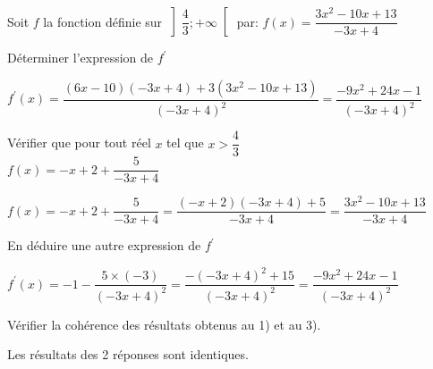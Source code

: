 \documentclass[12pt,a4paper]{article}  %
\begin{document}
Soit $f$ la fonction définie sur $\left] \dfrac{4}{3} ;+\infty\right[$ par: $f(x)=\dfrac{3 x^{2}-10x+13}{-3 x+4}$
\begin{enumMet}
	\item Déterminer l'expression de $f^{\prime}$\quad {}
	\begin{corrBox}
		$f^{\prime}(x)=\dfrac{(6 x-10)(-3 x+4)+3\left(3 x^{2}-10 x+13\right)}{(-3 x+4)^{2}}=\dfrac{-9 x^{2}+24 x-1}{(-3 x+4)^{2}}$
	\end{corrBox}
	\item Vérifier que pour tout réel $x$ tel que $x>\dfrac{4}{3}$\\ $f(x)=-x+2+\dfrac{5}{-3 x+4}$\quad {}
	\begin{corrBox}
		$f(x)=-x+2+\dfrac{5}{-3 x+4}=\dfrac{(-x+2)(-3 x+4)+5}{-3 x+4}=\dfrac{3 x^{2}-10 x+13}{-3 x+4}$
	\end{corrBox}
	\item En déduire une autre expression de $f^{\prime}$\quad {}
	\begin{corrBox}
		$f^{\prime}(x)=-1-\dfrac{5 \times(-3)}{(-3 x+4)^{2}}=\dfrac{-(-3 x+4)^{2}+15}{(-3 x+4)^{2}}=\dfrac{-9 x^{2}+24 x-1}{(-3 x+4)^{2}}$
	\end{corrBox}
	\item Vérifier la cohérence des résultats obtenus au 1) et au 3).\quad {}
	\begin{corrBox}
		Les résultats des 2 réponses sont identiques.
	\end{corrBox}
\end{enumMet}
\end{document}
